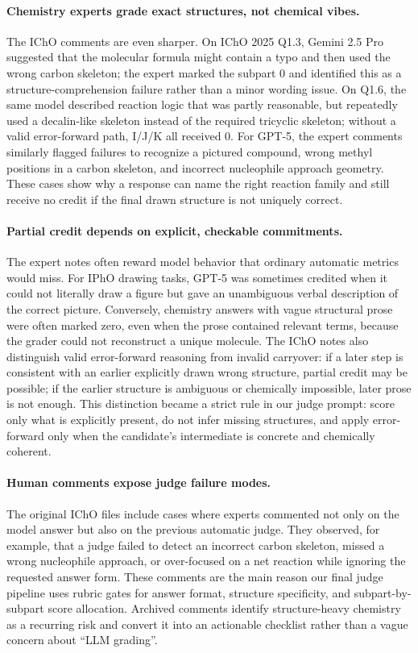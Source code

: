 \documentclass[11pt]{article}
\begin{document}
\paragraph{Chemistry experts grade exact structures, not chemical vibes.}
The IChO comments are even sharper.
On IChO 2025 Q1.3, Gemini 2.5 Pro suggested that the molecular formula might contain a typo and then used the wrong carbon skeleton; the expert marked the subpart 0 and identified this as a structure-comprehension failure rather than a minor wording issue.
On Q1.6, the same model described reaction logic that was partly reasonable, but repeatedly used a decalin-like skeleton instead of the required tricyclic skeleton; without a valid error-forward path, I/J/K all received 0.
For GPT-5, the expert comments similarly flagged failures to recognize a pictured compound, wrong methyl positions in a carbon skeleton, and incorrect nucleophile approach geometry.
These cases show why a response can name the right reaction family and still receive no credit if the final drawn structure is not uniquely correct.

\paragraph{Partial credit depends on explicit, checkable commitments.}
The expert notes often reward model behavior that ordinary automatic metrics would miss.
For IPhO drawing tasks, GPT-5 was sometimes credited when it could not literally draw a figure but gave an unambiguous verbal description of the correct picture.
Conversely, chemistry answers with vague structural prose were often marked zero, even when the prose contained relevant terms, because the grader could not reconstruct a unique molecule.
The IChO notes also distinguish valid error-forward reasoning from invalid carryover: if a later step is consistent with an earlier explicitly drawn wrong structure, partial credit may be possible; if the earlier structure is ambiguous or chemically impossible, later prose is not enough.
This distinction became a strict rule in our judge prompt: score only what is explicitly present, do not infer missing structures, and apply error-forward only when the candidate's intermediate is concrete and chemically coherent.

\paragraph{Human comments expose judge failure modes.}
The original IChO files include cases where experts commented not only on the model answer but also on the previous automatic judge.
They observed, for example, that a judge failed to detect an incorrect carbon skeleton, missed a wrong nucleophile approach, or over-focused on a net reaction while ignoring the requested answer form.
These comments are the main reason our final judge pipeline uses rubric gates for answer format, structure specificity, and subpart-by-subpart score allocation.
Archived comments identify structure-heavy chemistry as a recurring risk and convert it into an actionable checklist rather than a vague concern about ``LLM grading''.
\end{document}
